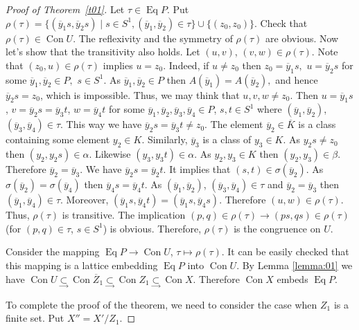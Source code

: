 \documentclass{birkau}
\numberwithin{equation}{section}
\theoremstyle{plain}
\theoremstyle{definition}
\DeclareMathOperator{\Con}{Con}
\DeclareMathOperator{\Eq}{Eq}
\begin{document}
\begin{proof}[Proof of Theorem~\ref{t01}]
        Let $\tau \in \Eq P.$ Put $\rho(\tau) = \{(\overline y_1s,\overline y_2s) \mid s\in S^1, (\overline y_1, \overline y_2)\in \tau\}\cup \{(z_0,z_0)\}.$ Check that $\rho(\tau)\in \Con U.$ The reflexivity and the symmetry of $\rho(\tau)$ are obvious. Now let's show that the transitivity also holds. Let $(u,v)$, $(v,w)\in \rho(\tau)$.
        Note that $(z_0,u) \in \rho(\tau)$ implies $u=z_0$. Indeed, if $u\ne z_0$ then $z_0=\overline y_1s,$ $u=\overline y_2s$ for some $\overline y_1, \overline y_2 \in P,$ $s\in S^1.$ As $\overline y_1, \overline y_2 \in P$ then $A(\overline y_1)=A(\overline y_2),$ and hence $\overline y_2s=z_0$, which is impossible.
        Thus, we may think that $u,v,w \ne z_0.$ Then $u=\overline y_1s$, $v=\overline y_2s=\overline y_3t$, $w=\overline y_4t$ for some $\overline y_1, \overline y_2, \overline y_3, \overline y_4 \in P$, $s,t\in S^1$ where $(\overline y_1, \overline y_2)$, $(\overline y_3, \overline y_4)\in \tau.$ This way we have $\overline y_2s=\overline y_3t \ne z_0.$ The element $\overline y_2 \in \overline K$ is a class containing some element $y_2\in K$. Similarly, $\overline y_3$ is a class of $y_3 \in K.$ As $y_2s\ne z_0$ then $(y_2,y_2s)\in\alpha$. Likewise $(y_3,y_3t)\in \alpha.$ As $y_2,y_3 \in K$ then $(y_2,y_3)\in \beta.$ Therefore $\overline y_2 =\overline y_3$. We have $\overline y_2s=\overline y_2t.$ It implies that $(s,t)\in \sigma (\overline y_2).$ As $\sigma(\overline y_2)=\sigma(\overline y_4)$ then $\overline y_4s=\overline y_4t.$ As $(\overline y_1, \overline y_2)$, $(\overline y_3, \overline y_4) \in \tau$ and $\overline y_2=\overline y_3$ then $(\overline y_1, \overline y_4) \in \tau$. Moreover, $(\overline y_1s, \overline y_4t)=(\overline y_1s, \overline y_4s)$. Therefore $(u,w)\in \rho(\tau)$. Thus, $\rho(\tau)$ is transitive. The implication $(p,q)\in \rho(\tau)\to (ps,qs) \in\rho(\tau)$ (for $(p,q)\in\tau$, $s\in S^1$) is obvious. Therefore, $\rho(\tau)$ is the congruence on $U$.

        Consider the mapping $\Eq P \to \Con U$, $\tau \mapsto \rho(\tau)$. It can be easily checked that this mapping is a lattice embedding $\Eq P$ into $\Con U$.
        By Lemma \ref{lemma:01} we have $\Con U \underset \to \subset \Con \overline Z_1 \underset \to \subset \Con Z_1 \underset\to \subset \Con X$. Therefore $\Con X$ embeds $\Eq P$.
		
		To complete the proof of the theorem, we need to consider the case when $Z_1$ is a finite set. Put $X'' = X'/{Z_1}$.
		

\end{proof}
\end{document}
